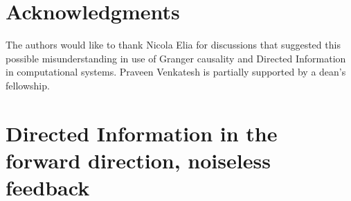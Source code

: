 \documentclass[conference]{IEEEtran}
\begin{document}
\section*{Acknowledgments}


The authors would like to thank Nicola Elia for discussions that suggested this possible misunderstanding in use of Granger causality and Directed Information in computational systems. Praveen Venkatesh is partially supported by a dean's fellowship. %






\newpage

\appendices

\section{Directed Information in the forward direction, noiseless feedback}
\label{app:appendix3}
\end{document}
